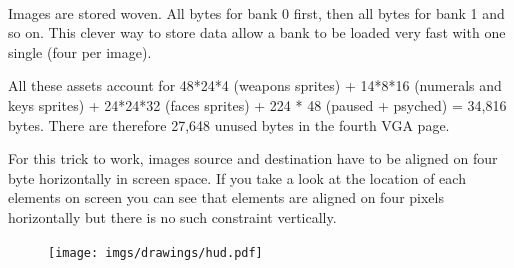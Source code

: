     \begin{minipage}{.3\textwidth}
  \end{minipage}
\begin{minipage}{.3\textwidth}
  \end{minipage}
\begin{minipage}{.3\textwidth}
  \end{minipage}
\par


\begin{minipage}{.1\textwidth}
  \end{minipage}
\begin{minipage}{.1\textwidth}
  \end{minipage}
\begin{minipage}{.1\textwidth}
  \end{minipage}
\begin{minipage}{.1\textwidth}
  \end{minipage}
  \begin{minipage}{.3\textwidth}
  \end{minipage}
\begin{minipage}{.3\textwidth}
  \end{minipage}\

 Images are stored woven. All bytes for bank 0 first, then all bytes for bank 1 and so on. This clever way to store data allow a bank to be loaded very fast with one single  (four  per image).\\
\par
All these assets account for 48*24*4 (weapons sprites) + 14*8*16 (numerals and keys sprites) + 24*24*32 (faces sprites) + 224 * 48 (paused + psyched) = 34,816 bytes. There are therefore 27,648 unused bytes in the fourth VGA page.\\
\par
For this trick to work, images source and destination have to be aligned on four byte horizontally in screen space. If you take a look at the location of each elements on screen you can see that elements are aligned on four pixels horizontally but there is no such constraint vertically.
\begin{figure}[H]
  \centering
 \texttt{[image: imgs/drawings/hud.pdf]}
\end{figure}


